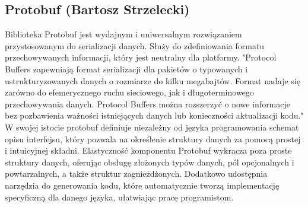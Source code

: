 \subsection{Protobuf (Bartosz Strzelecki)}

Biblioteka Protobuf jest wydajnym i uniwersalnym rozwiązaniem przystosowanym do serializacji
danych. Służy do zdefiniowania formatu przechowywanych informacji, który jest neutralny dla platformy.
"Protocol Buffers zapewniają format serializacji dla pakietów o typowanych i ustrukturyzowanych danych o rozmiarze do kilku megabajtów. Format nadaje się zarówno do efemerycznego ruchu sieciowego, jak i długoterminowego przechowywania danych. Protocol Buffers można rozszerzyć o nowe informacje bez pozbawienia ważności istniejących danych lub konieczności aktualizacji kodu."\cite{protobuf}
W swojej istocie protobuf definiuje niezależny od języka programowania schemat opisu interfejsu,
który pozwala na określenie struktury danych za pomocą prostej i intuicyjnej składni.
Elastyczność komponentu Protobuf wykracza poza proste struktury danych, oferując obsługę złożonych typów danych, pól opcjonalnych i powtarzalnych,
a także struktur zagnieżdżonych. Dodatkowo udostępnia narzędzia do generowania kodu,
które automatycznie tworzą implementację specyficzną dla danego języka, ułatwiając pracę programistom.

